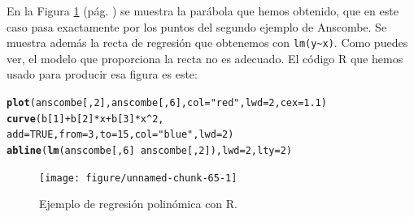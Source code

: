 \documentclass[10pt,a4paper]{article}\usepackage[]{graphicx}\usepackage[]{color}
\makeatletter
\newcommand{\hlnum}[1]{\textcolor[rgb]{0.686,0.059,0.569}{#1}}%
\newcommand{\hlstr}[1]{\textcolor[rgb]{0.192,0.494,0.8}{#1}}%
\newcommand{\hlopt}[1]{\textcolor[rgb]{0,0,0}{#1}}%
\newcommand{\hlstd}[1]{\textcolor[rgb]{0.345,0.345,0.345}{#1}}%
\newcommand{\hlkwc}[1]{\textcolor[rgb]{0.333,0.667,0.333}{#1}}%
\newcommand{\hlkwd}[1]{\textcolor[rgb]{0.737,0.353,0.396}{\textbf{#1}}}%
\newenvironment{kframe}{%
 \def\at@end@of@kframe{}%
 \ifinner\ifhmode%
  \def\at@end@of@kframe{\end{minipage}}%
  \begin{minipage}{\columnwidth}%
 \fi\fi%
 \def\FrameCommand##1{\hskip\@totalleftmargin \hskip-\fboxsep
 \colorbox{shadecolor}{##1}\hskip-\fboxsep
     \hskip-\linewidth \hskip-\@totalleftmargin \hskip\columnwidth}%
 \MakeFramed {\advance\hsize-\width
   \@totalleftmargin\z@ \linewidth\hsize
   \@setminipage}}%
 {\par\unskip\endMakeFramed%
 \at@end@of@kframe}
\newenvironment{knitrout}{}{} %
\makeatother
\begin{document}
En la Figura \ref{tut10:fig:RegresionPolinomica} (pág. \pageref{tut10:fig:RegresionPolinomica}) se muestra la parábola que hemos obtenido, que en este caso pasa exactamente por los puntos del segundo ejemplo de Anscombe. Se muestra además la recta de regresión que obtenemos con \verb#lm(y~x)#. Como puedes ver, el modelo que proporciona la recta  no es adecuado. El código R que hemos usado para producir esa figura es este:
\begin{knitrout}
\color{fgcolor}\begin{kframe}
\begin{alltt}
\hlkwd{plot}\hlstd{(anscombe[ ,} \hlnum{2}\hlstd{], anscombe[ ,} \hlnum{6}\hlstd{],} \hlkwc{col}\hlstd{=}\hlstr{"red"}\hlstd{,} \hlkwc{lwd}\hlstd{=}\hlnum{2}\hlstd{,} \hlkwc{cex}\hlstd{=}\hlnum{1.1}\hlstd{)}
\hlkwd{curve}\hlstd{(b[}\hlnum{1}\hlstd{]} \hlopt{+} \hlstd{b[}\hlnum{2}\hlstd{]} \hlopt{*} \hlstd{x} \hlopt{+} \hlstd{b[}\hlnum{3}\hlstd{]} \hlopt{*} \hlstd{x}\hlopt{^}\hlnum{2}\hlstd{,}
    \hlkwc{add} \hlstd{=} \hlnum{TRUE}\hlstd{,} \hlkwc{from} \hlstd{=} \hlnum{3}\hlstd{,} \hlkwc{to} \hlstd{=} \hlnum{15}\hlstd{,} \hlkwc{col}\hlstd{=}\hlstr{"blue"}\hlstd{,} \hlkwc{lwd}\hlstd{=}\hlnum{2}\hlstd{)}
\hlkwd{abline}\hlstd{(}\hlkwd{lm}\hlstd{(anscombe[ ,} \hlnum{6}\hlstd{]} \hlopt{~} \hlstd{anscombe[ ,} \hlnum{2}\hlstd{]),} \hlkwc{lwd}\hlstd{=}\hlnum{2}\hlstd{,} \hlkwc{lty}\hlstd{=}\hlnum{2}\hlstd{)}
\end{alltt}
\end{kframe}
\end{knitrout}

\begin{figure}[b!]
\begin{center}
\begin{knitrout}
\color{fgcolor}
\texttt{[image: figure/unnamed-chunk-65-1]} 

\end{knitrout}
\end{center}
\caption{Ejemplo de regresión polinómica con R.}
\label{tut10:fig:RegresionPolinomica}
\end{figure}
\end{document}

